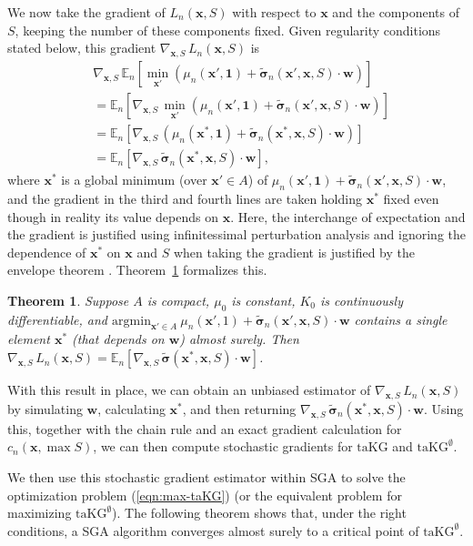 \documentclass[letterpaper]{article}
\newcommand{\cost}{c}
\newcommand{\x}{\mathbf{x}}
\renewcommand{\S}{S}
\newcommand{\w}{\mathbf{w}}
\newcommand{\sigmatilde}{\tilde{\boldsymbol{\sigma}}}
\newcommand{\one}{\mathbf{1}}
\newcommand{\deriv}{\nabla_{\x,\S}\,}
\newcommand{\loss}{L}
\newcommand{\taKG}{\text{taKG}}
\newcommand{\taKGE}{\text{taKG}^\emptyset}
\newtheorem{theorem}{Theorem}
\numberwithin{equation}{section}
\newcommand{\eqn}[1]{(\ref{eqn:#1})}
\begin{document}
We now take the gradient of $\loss_n(\x,\S)$ with respect to $\x$ and the components of $\S$, keeping the number of these components fixed.  
Given regularity conditions stated below, this gradient $\deriv\loss_n(\x,\S)$ is
\begin{align*}
&\deriv\mathbb{E}_{n}\left[\min_{\x'}\left(\mu_n\left(\x',\one\right)+\sigmatilde_{n}\left(\x', \x, \S\right)\cdot \w\right)\right]\\
&= \mathbb{E}_{n}\left[\deriv\min_{\x'}\left(\mu_n\left(\x',\one\right)+\sigmatilde_{n}\left(\x', \x, \S\right)\cdot \w\right)\right]\\
&= \mathbb{E}_{n}\left[\deriv\left(\mu_n\left(\x^*,\one\right)+\sigmatilde_{n}\left(\x^*, \x, \S\right)\cdot \w\right) \right]\\
&= \mathbb{E}_{n}\left[\deriv\sigmatilde_{n}\left(\x^*, \x, \S\right)\cdot \w\right],
\end{align*}
where $\x^*$ is a global minimum (over $\x'\in A$) of $\mu_n(\x',\one) + \sigmatilde_n(\x',\x,\S)\cdot \w$, and the gradient in the third and fourth lines are taken holding $\x^*$ fixed even though in reality its value depends on $\x$.
Here, the interchange of expectation and the gradient is justified using infinitessimal perturbation analysis \citep{l1990unified} and ignoring the dependence of $\x^*$ on $\x$ and $\S$ when taking the gradient is justified by the envelope theorem \citep{milgrom2002envelope}.
Theorem~\ref{stochastic_gradient} formalizes this.

\begin{theorem}
\label{stochastic_gradient}
Suppose $A$ is compact, $\mu_0$ is constant, $K_0$ is continuously differentiable, and $\mathrm{argmin}_{\x'\in A}\ \mu_{n}(\x', 1)+\sigmatilde_n\left(\x', \x, \S\right)\cdot \w$ contains a single element $\x^*$ (that depends on $\w$) almost surely. Then $\deriv\loss_n(\x,\S) = \mathbb{E}_n\left[ \deriv\sigmatilde(\x^*,\x,\S)\cdot  \w \right]$.
\end{theorem}

With this result in place, we can obtain an unbiased estimator of $\deriv \loss_n(\x,\S)$ by simulating $\w$, calculating $\x^*$, and then returning $\deriv \sigmatilde_n(\x^*,\x,\S)\cdot  \w$.
Using this, together with the chain rule and an exact gradient calculation for $\cost_n(\x,\max \S)$,
we can then compute stochastic gradients for $\taKG$ and $\taKGE$.

We then use this stochastic gradient estimator within SGA \citep{kushner2003stochastic}
to solve the optimization problem \eqn{max-taKG} (or the equivalent problem for maximizing $\taKGE$).  The following theorem shows that, under the right conditions, a SGA algorithm converges almost surely to a critical point of $\taKGE$. 
\end{document}
